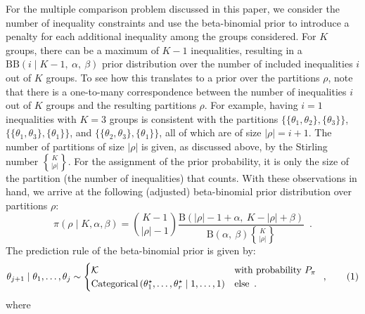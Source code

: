 \documentclass[11pt,a4paper]{article}
\theoremstyle{definition} %
\theoremstyle{case}
\newcommand{\FBeta}[2]{\text{B}\left({#1},\ {#2}\right)}
\newcommand{\BetaBinom}[4]{\text{BB}\left(#1 \mid #2 ,\ #3 ,\ #4 \right)}
\DeclareRobustCommand{\stirling}{\genfrac\{\}{0pt}{}}
\newcommand{\len}{r} %
\newcommand{\numberthis}{\addtocounter{equation}{1}\tag{\theequation}}
\begin{document}
For the multiple comparison problem discussed in this paper, we consider the number of inequality constraints and use the beta-binomial prior to introduce a penalty for each additional inequality among the groups considered. For $K$ groups, there can be a maximum of $K - 1$ inequalities, resulting in a $\BetaBinom{i}{K-1}{\alpha}{\beta}$ prior distribution over the number of included inequalities $i$ out of $K$ groups. To see how this translates to a prior over the partitions $\rho$, note that there is a one-to-many correspondence between the number of inequalities $i$ out of $K$ groups and the resulting partitions $\rho$. For example, having $i = 1$ inequalities with $K = 3$ groups is consistent with the partitions $\{\{\theta_1, \theta_2\}, \{\theta_3\}\}$, $\{\{\theta_1, \theta_3\}, \{\theta_1\}\}$, and $\{\{\theta_2, \theta_3\}, \{\theta_1\}\}$, all of which are of size $|\rho| = i + 1$. The number of partitions of size $|\rho|$ is given, as discussed above, by the Stirling number $\stirling{K}{|\rho|}$. For the assignment of the prior probability, it is only the size of the partition (the number of inequalities) that counts. With these observations in hand, we arrive at the following (adjusted) beta-binomial prior distribution over partitions $\rho$:
\begin{equation}
    \pi(\rho \mid K, \alpha, \beta) = \binom{K - 1}{|\rho| - 1} 
    \frac{\FBeta{|\rho| - 1 + \alpha}{K - |\rho| + \beta}}
    {\FBeta{\alpha}{\beta}\stirling{K}{|\rho|}} \enspace .
\end{equation}
The prediction rule of the beta-binomial prior is given by:
\begin{equation}
    \theta_{j + 1} \mid \theta_1, \ldots, \theta_j \sim \begin{cases}
    \mathcal{K} & \text{with probability } P_{\pi} \\
    \text{Categorical}\left(\theta_1^{\star}, \ldots, \theta_\len^{\star} \mid 1, \ldots, 1\right) & \text{else} \enspace .
    \end{cases} \enspace , \numberthis
\end{equation}
where
\end{document}
